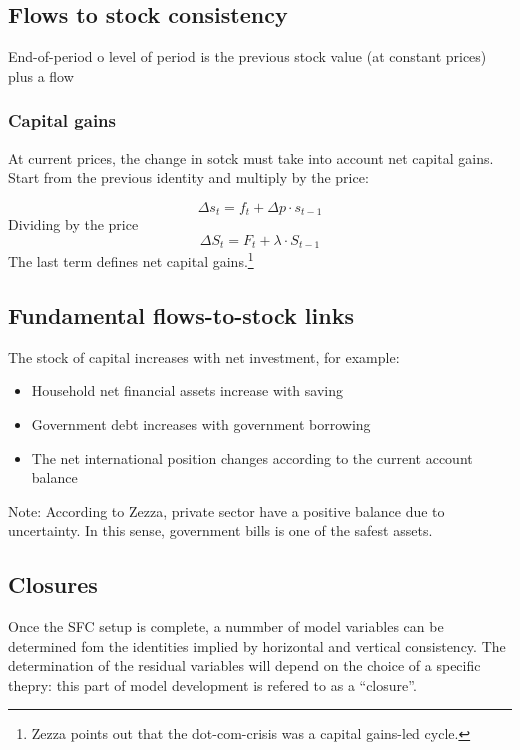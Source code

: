\documentclass[11pt]{article}
\begin{document}
\subsection*{Flows to stock consistency}
\label{sec:orgc21ba7d}

End-of-period o level of period is the previous stock value (at constant prices)  plus a flow

\subsubsection*{Capital gains}
\label{sec:orgb033ad5}

At current prices, the change in sotck must take into account net capital gains.
Start from the previous identity and multiply by the price:

\[\Delta s_{t} = f_{t} + \Delta p\cdot s_{t-1}\]
Dividing by the price
\[\Delta S_{t} = F_{t} + \lambda\cdot S_{t-1}\]
The last term defines net capital gains.\footnote{Zezza points out that the dot-com-crisis was a capital gains-led cycle.}


\subsection*{Fundamental flows-to-stock links}
\label{sec:org40a34cf}

The stock of capital increases with net investment, for example:
\begin{itemize}
\item Household net financial assets increase with saving
\item Government debt increases with government borrowing
\item The net international position changes according to the current account balance
\end{itemize}

Note: According to Zezza, private sector have a positive balance due to uncertainty.
In this sense, government bills is one of the safest assets.

\subsection*{Closures}
\label{sec:orga7a1b53}

Once the SFC setup is complete, a nummber of model variables can be determined fom the identities implied by horizontal and vertical consistency.
The determination of the residual variables will depend on the choice of a specific thepry: this part of model development is refered to as a ``closure''.
\end{document}
